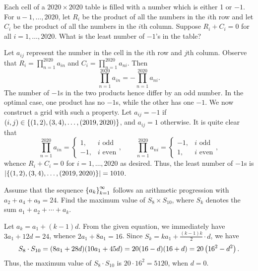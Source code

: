 \begin{question}[1010]\label{Q::2020-O-1-12}
    Each cell of a $2020 \times 2020$ table is filled with a number which is either 1 or $-1$. For $u - 1, \ldots, 2020$, let $R_i$ be the product of all the numbers in the $i$th row and let $C_i$ be the product of all the numbers in the $i$th column. Suppose $R_i + C_i = 0$ for all $i = 1, \ldots, 2020$. What is the least number of $-1$'s in the table?
\end{question}
\begin{solution*}
    Let $a_{ij}$ represent the number in the cell in the $i$th row and $j$th column. Observe that $R_i = \prod_{n = 1}^{2020} a_{in}$ and $C_i = \prod_{n=1}^{2020} a_{ni}$. Then \[\prod_{n = 1}^{2020} a_{in} = -\prod_{n=1}^{2020} a_{ni}.\] The number of $-1$s in the two products hence differ by an odd number. In the optimal case, one product has no $-1$s, while the other has one $-1$. We now construct a grid with such a property. Let $a_{ij} = -1$ if $(i, j) \in \left\lbrace (1, 2), (3, 4), \ldots, (2019, 2020) \right\rbrace$, and $a_{ij} = 1$ otherwise. It is quite clear that \[\prod_{n = 1}^{2020} a_{in} = \begin{cases}
        1, & i \text{ odd}\\
        -1, & i \text{ even}
    \end{cases}, \qquad \prod_{n = 1}^{2020} a_{ni} = \begin{cases}
        -1, & i \text{ odd}\\
        1, & i \text{ even}
    \end{cases},\] whence $R_i + C_i = 0$ for $i = 1, \ldots, 2020$ as desired. Thus, the least number of $-1$s is $\left\lvert \left\lbrace (1, 2), (3, 4), \ldots, (2019, 2020) \right\rbrace \right\rvert = 1010$.
\end{solution*}

\begin{question}[5120]\label{Q::2020-O-1-13}
    Assume that the sequence $\left\lbrace a_k \right\rbrace_{k=1}^\infty$ follows an arithmetic progression with $a_2 + a_4 + a_9 = 24$. Find the maximum value of $S_8 \times S_{10}$, where $S_k$ denotes the sum $a_1 + a_2 + \cdots + a_k$.
\end{question}
\begin{solution*}
    Let $a_k = a_1 + (k-1)d$. From the given equation, we immediately have $3a_1 + 12d = 24$, whence $2a_1 + 8a_1 = 16$. Since $S_k = ka_1 + \frac{(k-1)k}2 \cdot d$, we have \[S_8 \cdot S_{10} = (8a_1 + 28d)(10a_1 + 45d) = 20(16 - d)(16 + d) = 20\left( 16^2 - d^2 \right).\] Thus, the maximum value of $S_8 \cdot S_{10}$ is $20 \cdot 16^2 = 5120$, when $d = 0$.
\end{solution*}

